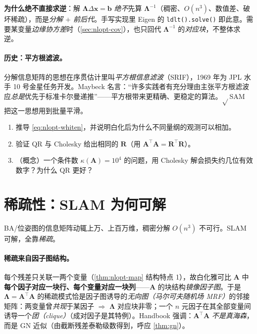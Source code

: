 \begin{note}
\textbf{为什么绝不直接求逆}：解 $\boldsymbol{\Lambda}\Delta\mathbf{x}=\mathbf{b}$ \emph{绝不}先算 $\boldsymbol{\Lambda}^{-1}$（稠密、$O(n^3)$、数值差、破坏稀疏），而是\emph{分解 $+$ 前后代}。手写实现里 Eigen 的 \texttt{ldlt().solve()} 即此意。需要某变量\emph{边缘协方差}时（\cref{sec:nlopt-cov}），也只回代 $\boldsymbol{\Lambda}^{-1}$ 的\emph{对应块}，不整体求逆。
\end{note}

\paragraph{历史：平方根滤波。}\cite{dellaert2017factor,carlone2026handbook}
分解信息矩阵的思想在序贯估计里叫\emph{平方根信息滤波}（SRIF），1969 年为 JPL 水手 10 号金星任务开发。Maybeck 名言：“许多实践者有充分理由主张平方根滤波应\emph{总是}优先于标准卡尔曼递推”——平方根带来更精确、更稳定的算法。$\sqrt{}$SAM\cite{dellaert2017factor} 把这一思想用到批量平滑。

\begin{practice}
\begin{enumerate}
  \item 推导 \cref{eq:nlopt-whiten}，并说明白化后为什么不同量纲的观测可以相加。
  \item 验证 QR 与 Cholesky 给出相同的 $\mathbf{R}$（用 $\mathbf{A}^\top\mathbf{A}=\mathbf{R}^\top\mathbf{R}$）。
  \item （概念）一个条件数 $\kappa(\mathbf{A})=10^4$ 的问题，用 Cholesky 解会损失约几位有效数字？为什么 QR 更好？
\end{enumerate}
\end{practice}

\section{稀疏性：SLAM 为何可解}
\label{sec:nlopt-sparse}

BA/位姿图的信息矩阵动辄上万、上百万维，稠密分解 $O(n^3)$ 不可行。SLAM 可解，全靠\emph{稀疏}\cite{carlone2026handbook,gaoxiang2019slam14,dellaert2017factor}。

\paragraph{稀疏来自因子图结构。}\cite{dellaert2017factor,carlone2026handbook}
每个残差只关联一两个变量（\cref{thm:nlopt-map} 结构特点 1），故白化雅可比 $\mathbf{A}$ 中\textbf{每个因子对应一块行、每个变量对应一块列}——$\mathbf{A}$ 的块结构\emph{镜像因子图}。于是 $\boldsymbol{\Lambda}=\mathbf{A}^\top\mathbf{A}$ 的稀疏模式恰是因子图诱导的\emph{无向图（马尔可夫随机场 MRF）}的邻接矩阵：两变量曾\emph{共现}于某因子 $\Rightarrow$ $\boldsymbol{\Lambda}$ 对应块非零；一个 $n$ 元因子在其全部变量间诱导一个\emph{团（clique）}（成对因子是其特例）。Handbook\cite{carlone2026handbook} 强调：$\mathbf{A}^\top\mathbf{A}$ \emph{不是真海森}，而是 GN 近似（由截断残差泰勒级数得到，呼应 \cref{thm:gn}）。

